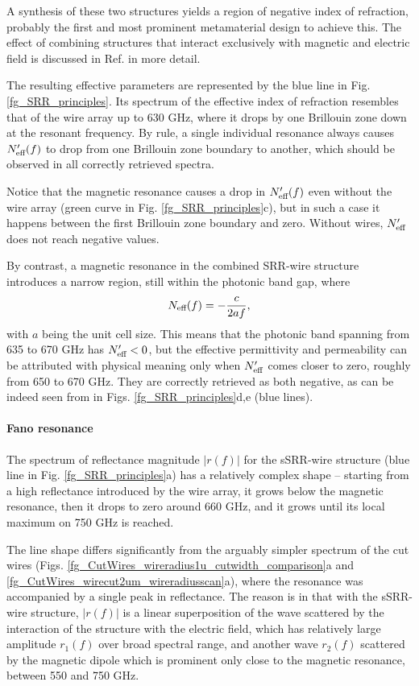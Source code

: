A synthesis of these two structures yields a region of negative index of refraction, probably the first \cite{pendry2000negative} and most prominent metamaterial design to achieve this. The effect of combining structures that interact exclusively with magnetic and electric field is discussed in Ref. \cite{koschny2004effective} in more detail.

The resulting effective parameters are represented by the blue line in Fig. \ref{fg_SRR_principles}. Its spectrum of the effective index of refraction resembles that of the wire array up to 630 GHz, where it drops by one Brillouin zone down at the resonant frequency.
By rule, a single individual resonance always causes $N_{\text{eff} }'(f)$ to drop from one Brillouin zone boundary to another, which should be observed in all correctly retrieved spectra. 

Notice that the magnetic resonance causes a drop in $N_{\text{eff} }'(f)$ even without the wire array (green curve in Fig. \ref{fg_SRR_principles}c), but in such a case it happens between the first Brillouin zone boundary and zero. Without wires, $N_{\text{eff} }'$ does not reach negative values.

By contrast, a magnetic resonance in the combined SRR-wire structure introduces a narrow region, still within the photonic band gap, where 
\begin{equation} N_{\text{eff} }(f) = -\frac{c}{2 a f}, \label{eq_BZN2}\end{equation}
with $a$ being the unit cell size.	
This means that the photonic band spanning from 635 to 670 GHz has $N_{\text{eff} }'<0$, but the effective permittivity and permeability can be attributed with physical meaning only when $N_{\text{eff} }'$ comes closer to zero, roughly from 650 to 670 GHz. They are correctly retrieved as both negative, as can be indeed seen from in Figs. \ref{fg_SRR_principles}d,e (blue lines).

\paragraph{Fano resonance} %
The spectrum of reflectance magnitude $|r(f)|$ for the sSRR-wire structure (blue line in Fig. \ref{fg_SRR_principles}a) has a relatively complex shape -- starting from a high reflectance introduced by the wire array, it grows below the magnetic resonance, then it drops to zero around 660 GHz, and it grows until its local maximum on 750 GHz is reached.

The line shape differs significantly from the arguably simpler spectrum of the cut wires (Figs. \ref{fg_CutWires_wireradius1u_cutwidth_comparison}a and \ref{fg_CutWires_wirecut2um_wireradiusscan}a), where the resonance was accompanied by a single peak in reflectance. 
The reason is in that with the sSRR-wire structure, $|r(f)|$ is a linear superposition of the wave scattered by the interaction of the structure with the electric field, which has relatively large amplitude $r_{1}(f)$ over broad spectral range, and another wave $r_{2}(f)$ scattered by the magnetic dipole which is prominent only close to the magnetic resonance, between 550 and 750 GHz.

